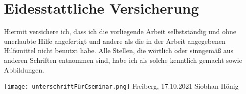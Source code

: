 \documentclass[11pt]{article}
\begin{document}
\pagebreak

\section{Eidesstattliche Versicherung}


Hiermit versichere ich, dass ich die vorliegende Arbeit selbstständig und ohne unerlaubte Hilfe angefertigt und andere als die in der Arbeit angegebenen Hilfsmittel nicht benutzt habe. 
Alle Stellen, die wörtlich oder sinngemäß aus anderen Schriften entnommen sind, habe ich als solche kenntlich gemacht sowie Abbildungen.

\texttt{[image: unterschriftFürCseminar.png]}
Freiberg, 17.10.2021 \hfill Siobhan Hönig

\pagebreak


\end{document}
